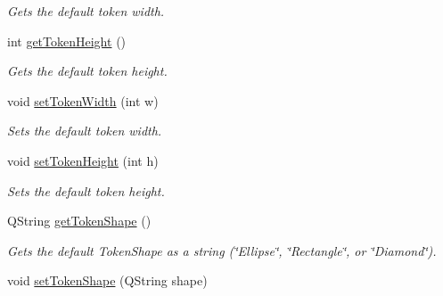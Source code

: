 \begin{DoxyCompactItemize}
\begin{DoxyCompactList}\small\item\em Gets the default token width. \end{DoxyCompactList}\item 
\hypertarget{class_picto_1_1_token_factory_graphic_aa214e20fb18f349d241f173f33f67e19}{int \hyperlink{class_picto_1_1_token_factory_graphic_aa214e20fb18f349d241f173f33f67e19}{get\-Token\-Height} ()}\label{class_picto_1_1_token_factory_graphic_aa214e20fb18f349d241f173f33f67e19}

\begin{DoxyCompactList}\small\item\em Gets the default token height. \end{DoxyCompactList}\item 
\hypertarget{class_picto_1_1_token_factory_graphic_a8214d9f88bb3210c5b68eef8bd94fd3b}{void \hyperlink{class_picto_1_1_token_factory_graphic_a8214d9f88bb3210c5b68eef8bd94fd3b}{set\-Token\-Width} (int w)}\label{class_picto_1_1_token_factory_graphic_a8214d9f88bb3210c5b68eef8bd94fd3b}

\begin{DoxyCompactList}\small\item\em Sets the default token width. \end{DoxyCompactList}\item 
\hypertarget{class_picto_1_1_token_factory_graphic_a77e0916dde2b86b0cbc173635b623477}{void \hyperlink{class_picto_1_1_token_factory_graphic_a77e0916dde2b86b0cbc173635b623477}{set\-Token\-Height} (int h)}\label{class_picto_1_1_token_factory_graphic_a77e0916dde2b86b0cbc173635b623477}

\begin{DoxyCompactList}\small\item\em Sets the default token height. \end{DoxyCompactList}\item 
\hypertarget{class_picto_1_1_token_factory_graphic_a825fcd0ffe42c568263fccdc28739bba}{Q\-String \hyperlink{class_picto_1_1_token_factory_graphic_a825fcd0ffe42c568263fccdc28739bba}{get\-Token\-Shape} ()}\label{class_picto_1_1_token_factory_graphic_a825fcd0ffe42c568263fccdc28739bba}

\begin{DoxyCompactList}\small\item\em Gets the default Token\-Shape as a string (\char`\"{}\-Ellipse\char`\"{}, \char`\"{}\-Rectangle\char`\"{}, or \char`\"{}\-Diamond\char`\"{}). \end{DoxyCompactList}\item 
\hypertarget{class_picto_1_1_token_factory_graphic_a944940fa04afdaed603a51fae1861cc2}{void \hyperlink{class_picto_1_1_token_factory_graphic_a944940fa04afdaed603a51fae1861cc2}{set\-Token\-Shape} (Q\-String shape)}\label{class_picto_1_1_token_factory_graphic_a944940fa04afdaed603a51fae1861cc2}


\end{DoxyCompactItemize}
